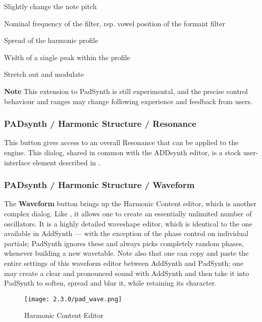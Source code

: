  {}Slightly change the note pitch

 {}Nominal frequency of the filter, rsp. vowel position of
the formant filter

 {}Spread of the harmonic profile

 {}Width of a single peak within the profile

 {}Stretch out and modulate


\textbf{Note}
This extension to PadSynth is still experimental, and the precise control
behaviour and ranges may change following experience and feedback from users.

\subsubsection{PADsynth / Harmonic Structure / Resonance}
\label{subsubsec:padsynth_harmonic_structure_resonance}

   This button gives access to an overall Resonance that can be applied to the
   engine.  This dialog, shared in common with the ADDsynth editor, is a stock
   user-interface element described in
   .

\subsubsection{PADsynth / Harmonic Structure / Waveform}
\label{subsubsec:padsynth_harmonic_structure_change}

   The \textbf{Waveform} button brings up the
   Harmonic Content editor, which is another complex dialog.
   Like ,
   it allows one to create an essentially unlimited number of oscillators.
   It is a highly detailed waveshape editor, which is identical to the one
   available in AddSynth — with the exception of the phase control on individual
   partials; PadSynth ignores these and always picks completely random phases,
   whenever building a new wavetable. Note also that one can copy and paste the
   entire settings of this waveform editor between AddSynth and PadSynth; one may
   create a clear and pronounced sound with AddSynth and then take it into
   PadSynth to soften, spread and blur it, while retaining its character.

\begin{figure}[H]
   \centering
   \texttt{[image: 2.3.0/pad\_wave.png]}
   \caption{Harmonic Content Editor}
   \label{fig:padsynth_harmonic_content_editor}
\end{figure}

